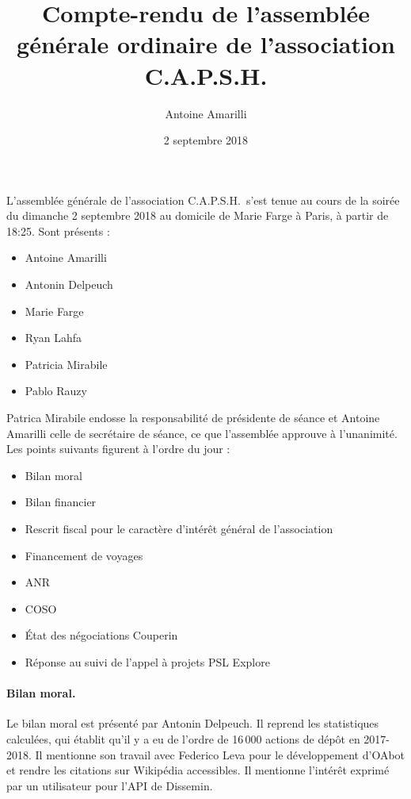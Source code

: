 \documentclass{scrartcl}
\title{Compte-rendu de l'assemblée générale ordinaire de l'association C.A.P.S.H.}
\author{Antoine Amarilli}
\date{2 septembre 2018}
\begin{document}
\maketitle

L'assemblée générale de l'association C.A.P.S.H.\ s'est tenue au cours de la
soirée du dimanche 2 septembre 2018 au domicile de Marie Farge à Paris, à partir
de 18:25.
% 
Sont présents :

\medskip

\begin{itemize}
\item Antoine Amarilli
\item Antonin Delpeuch
\item Marie Farge
\item Ryan Lahfa
\item Patricia Mirabile
\item Pablo Rauzy
\end{itemize}

\medskip

Patrica Mirabile endosse la responsabilité de présidente de séance et Antoine
Amarilli celle de secrétaire de séance, ce que l'assemblée approuve à l'unanimité.
Les points suivants figurent à l'ordre
du jour :

\medskip

\begin{itemize}
\item Bilan moral
\item Bilan financier
\item Rescrit fiscal pour le caractère d'intérêt général de l'association
\item Financement de voyages
\item ANR
\item COSO
\item État des négociations Couperin
\item Réponse au suivi de l'appel à projets PSL Explore
\end{itemize}

\paragraph{Bilan moral.} 
Le bilan moral est présenté par Antonin Delpeuch.
Il reprend les statistiques calculées, qui établit qu'il y a eu de l'ordre de
16\,000 actions de dépôt en 2017-2018.
Il mentionne son travail avec Federico Leva pour le développement d'OAbot et
rendre les citations sur Wikipédia accessibles. Il mentionne l'intérêt exprimé
par un utilisateur pour l'API de Dissemin.
\end{document}
